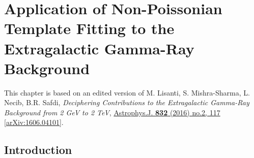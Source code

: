 \chapter{Application of Non-Poissonian Template Fitting to the Extragalactic Gamma-Ray Background}
\label{ch:igrb}

\setcounter{footnote}{0}

This chapter is based on an edited version of M. Lisanti, S. Mishra-Sharma, L. Necib, B.R. Safdi, \emph{Deciphering Contributions to the Extragalactic Gamma-Ray Background from 2 GeV to 2 TeV},  \href{http://iopscience.iop.org/article/10.3847/0004-637X/832/2/117/meta}{Astrophys.J. \textbf{832} (2016) no.2, 117} \href{https://arxiv.org/abs/1606.04101}{[arXiv:1606.04101]}.%

\section{Introduction}

